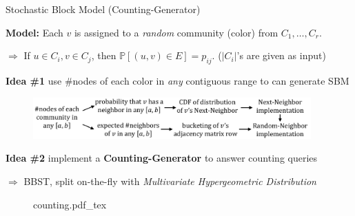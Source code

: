 \vspace{-0.3em}
\begin{block}{Stochastic Block Model (Counting-Generator)} %

\textbf{Model:} Each $v$ is assigned to a \emph{random} community (color) from $C_1, \ldots, C_r$.

\quad$\Rightarrow$ If $u\in C_i, v\in C_j$, then $\mathbb {P}[{(u, v)\in E}] = p_{ij}$.
($|C_i|$'s are given as input)

\vspace{15pt}

\colorbox{TealBlue}{\textbf{Idea \#1}} use \#nodes of each color in \emph{any} contiguous range to can generate SBM

\begin{figure}[h]
    \centering
\includegraphics[clip, width=0.95\textwidth]{chart.pdf}
\end{figure}

\colorbox{TealBlue}{\textbf{Idea \#2}} implement a \textbf{Counting-Generator} to answer counting queries

\quad$\Rightarrow$ BBST, split on-the-fly with \emph{Multivariate Hypergeometric Distribution}

\vspace{0.5em}
\begin{figure}[h!]\centering
    \def\svgwidth{0.95\columnwidth}
    {counting.pdf_tex}
\end{figure}


\end{block}
